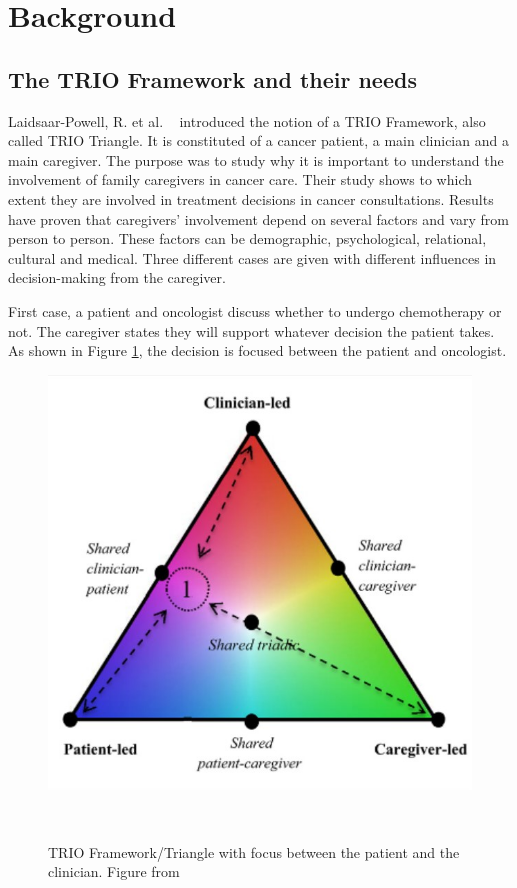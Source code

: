 \documentclass{sigchi}
\begin{document}
\section{Background}

\subsection{The TRIO Framework and their needs}

Laidsaar-Powell, R. et al. ~\cite{Laidsaar-Powell2017} introduced the notion of a TRIO Framework, also called TRIO Triangle. It is constituted of a cancer patient, a main clinician and a main caregiver. The purpose was to study why it is important to understand the involvement of family caregivers in cancer care. Their study shows to which extent they are involved in treatment decisions in cancer consultations. Results have proven that caregivers’ involvement depend on several factors and vary from person to person. These factors can be demographic, psychological, relational, cultural and medical. Three different cases are given with different influences in decision-making from the caregiver.

First case, a patient and oncologist discuss whether to undergo chemotherapy or not. The caregiver states they will support whatever decision the patient takes. As shown in Figure \ref{fig:PatientClinicianFocus}, the decision is focused between the patient and oncologist.

\raggedbottom

\begin{figure}[H]
\centering
  \includegraphics[width=0.9\columnwidth]{figures/Triangle1Screenshot.jpg}
  \caption{TRIO Framework/Triangle with focus between the patient and the clinician. Figure from}~\label{fig:PatientClinicianFocus}
\end{figure}
\end{document}
